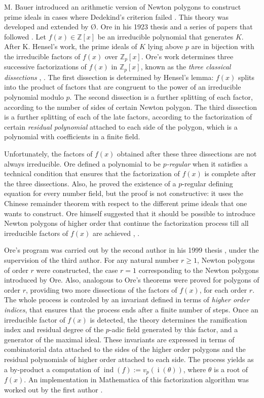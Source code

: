\documentclass{amsart}
\newcommand{\Z}{\mathbb Z}
\def\op{\operatorname}
\def\indx{\operatorname{i}}
\def\ind{\op{ind}}
\def\t{\theta}
\begin{document}
M. Bauer introduced an arithmetic version of Newton polygons to construct prime ideals in cases where Dedekind's criterion failed
\cite{bau}. This theory was developed and extended by \O{}. Ore in his 1923 thesis and a series of papers that followed \cite{ore1,ore2,ore3,ore4,ore5}. Let $f(x)\in\Z[x]$ be an irreducible polynomial that generates $K$. After K. Hensel's work, the prime ideals of $K$ lying above $p$ are in bijection with the irreducible factors of $f(x)$ over $\Z_p[x]$. Ore's work determines three successive factorizations of $f(x)$ in $\Z_p[x]$, known as the \emph{three classical dissections} \cite{ber}, \cite{coh}. The first dissection is determined by Hensel's lemma: $f(x)$ splits into the product of factors that are congruent to the power of an irreducible polynomial modulo $p$. The second dissection is a further splitting of each factor, according to the number of sides of certain Newton polygon. The third dissection is a further splitting of each of the late factors, according to the factorization of certain \emph{residual polynomial} attached to each side of the polygon, which is a polynomial with coefficients in a finite field.

Unfortunately, the factors of $f(x)$ obtained after these three dissections are not always irreducible.
Ore defined a  polynomial to be \emph{$p$-regular} when it satisfies a technical condition that ensures that the factorization of $f(x)$ is complete after the three dissections. Also, he proved the existence of a $p$-regular defining equation for every number field, but the proof is not constructive: it uses the Chinese remainder theorem with respect to the different prime ideals that one wants to construct. Ore himself suggested that it should be possible to introduce Newton polygons of higher order that continue the factorization process till all irreducible factors of $f(x)$ are achieved \cite[Ch.4,\S8]{ore1}, \cite[\S5]{ore5}.

Ore's program was carried out by the second author in his 1999 thesis \cite{m}, under the supervision of the third author.
For any natural number $r\ge1$, Newton polygons of order $r$ were constructed, the case $r=1$ corresponding to the Newton polygons
introduced by Ore. Also, analogous to Ore's theorems were proved for polygons of order $r$, providing two more dissections of the factors of $f(x)$, for each order $r$. The whole process is controled by an invariant defined in terms of \emph{higher order indices}, that ensures that the process ends after a finite number of steps. Once an irreducible factor of $f(x)$ is detected, the theory determines the ramification index and residual degree of the $p$-adic field generated by this factor, and a generator of the maximal ideal. These invariants are expressed in terms of combinatorial data attached to the sides of the higher order polygons and the residual polynomials of higher order attached to each side. The process yields as a by-product a computation of $\ind(f):=v_p(\indx(\t))$, where $\t$ is a root of $f(x)$. An implementation in Mathematica of this factorization algorithm was worked out by the first author \cite{gua}.   
\end{document}
